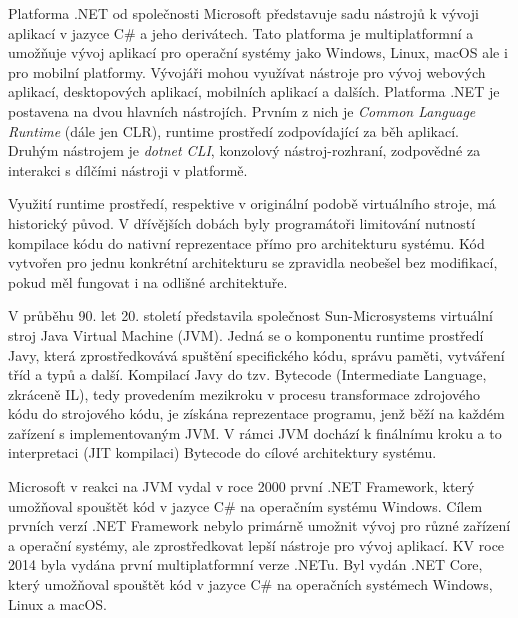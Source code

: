 


Platforma .NET od společnosti Microsoft představuje sadu nástrojů k vývoji aplikací v jazyce C\# a jeho derivátech. Tato platforma je multiplatformní a umožňuje vývoj aplikací pro operační systémy jako Windows, Linux, macOS ale i pro mobilní platformy. Vývojáři mohou využívat nástroje pro vývoj webových aplikací, desktopových aplikací, mobilních aplikací a dalších. Platforma .NET je postavena na dvou hlavních nástrojích. Prvním z nich je \textit{Common Language Runtime} (dále jen CLR), runtime prostředí zodpovídající za běh aplikací. Druhým nástrojem je \textit{dotnet CLI}, konzolový nástroj-rozhraní, zodpovědné za interakci s dílčími nástroji v platformě. \cite{Richter2012}


Využití runtime prostředí, respektive v originální podobě virtuálního stroje, má historický původ. V dřívějších dobách byly programátoři limitování nutností kompilace kódu do nativní reprezentace přímo pro architekturu systému. Kód vytvořen pro jednu konkrétní architekturu se zpravidla neobešel bez modifikací, pokud měl fungovat i na odlišné architektuře.

V průběhu 90. let 20. století představila společnost Sun-Microsystems virtuální stroj Java Virtual Machine (JVM). Jedná se o komponentu runtime prostředí Javy, která zprostředkovává spuštění specifického kódu, správu paměti, vytváření tříd a typů a další. Kompilací Javy do tzv. Bytecode (Intermediate Language, zkráceně IL), tedy provedením mezikroku v procesu transformace zdrojového kódu do strojového kódu, je získána reprezentace programu, jenž běží na každém zařízení s implementovaným JVM. V rámci JVM dochází k finálnímu kroku a to interpretaci (JIT kompilaci) Bytecode do cílové architektury systému. 

Microsoft v reakci na JVM vydal v roce 2000 první .NET Framework, který umožňoval spouštět kód v jazyce C\# na operačním systému Windows. Cílem prvních verzí .NET Framework nebylo primárně umožnit vývoj pro různé zařízení a operační systémy, ale zprostředkovat lepší nástroje pro vývoj aplikací. KV roce 2014 byla vydána první multiplatformní verze .NETu. Byl vydán .NET Core, který umožňoval spouštět kód v jazyce C\# na operačních systémech Windows, Linux a macOS. \cite{Richter2012}

